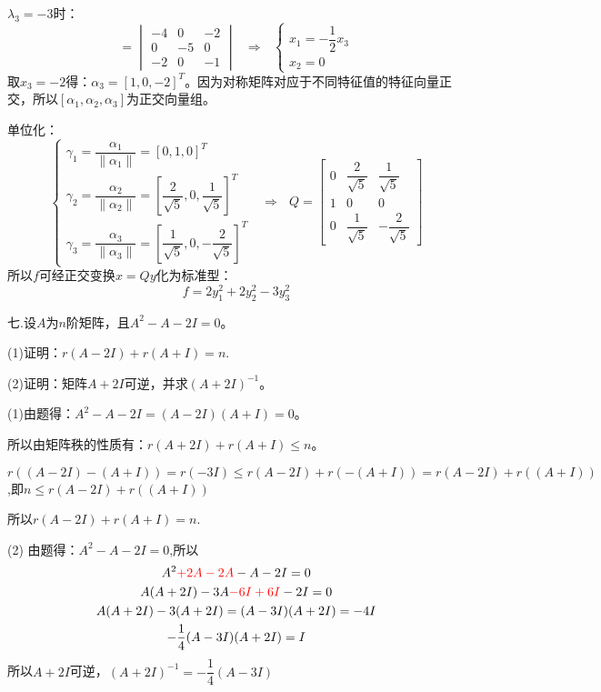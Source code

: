 \documentclass{article}
\begin{document}
\begin{jie}
$\lambda_3=-3$时：
\begin{equation*}
  [\lambda E-A]=
  \begin{vmatrix}
  -4& 0 & -2\\
  0 & -5 & 0\\
  -2 & 0 & -1
  \end{vmatrix}~~~\Rightarrow~~~
  \begin{cases}
   x_1=-\dfrac{1}{2}x_3\\
   x_2=0
  \end{cases}
\end{equation*}
取$x_3=-2$得：$\alpha_3=[1,0,-2]^T$。因为对称矩阵对应于不同特征值的特征向量正交，所以$[\alpha_1,\alpha_2,\alpha_3]$为正交向量组。

单位化：
\begin{equation*}
\begin{cases}
\gamma_1=\dfrac{\alpha_1}{\|\alpha_1\|}=[0,1,0]^T\\
\gamma_2=\dfrac{\alpha_2}{\|\alpha_2\|}=\left[\dfrac{2}{\sqrt{5}},0,\dfrac{1}{\sqrt{5}}\right]^T\\[2mm]
\gamma_3=\dfrac{\alpha_3}{\|\alpha_3\|}=\left[\dfrac{1}{\sqrt{5}},0,-\dfrac{2}{\sqrt{5}}\right]^T
\end{cases}~~~\Rightarrow~~~Q=
\begin{bmatrix}
  0 & \dfrac{2}{\sqrt{5}}& \dfrac{1}{\sqrt{5}} \\
  1 & 0& 0\\
  0&  \dfrac{1}{\sqrt{5}}& -\dfrac{2}{\sqrt{5}}
\end{bmatrix}
\end{equation*}
所以$f$可经正交变换$x=Qy$化为标准型：
\begin{equation*}
  f=2y_{1}^2+2y_{2}^2-3y_{3}^2
\end{equation*}
\end{jie}

七.设$A$为$n$阶矩阵，且$A^{2}-A-2I=0$。

(1)证明：$r(A-2I)+r(A+I)=n$.

(2)证明：矩阵$A+2I$可逆，并求$(A+2I)^{-1}$。

\begin{zhengming}
(1)由题得：$A^{2}-A-2I=(A-2I)(A+I)=0$。

所以由矩阵秩的性质有：$r(A+2I)+r(A+I)\leq n$。

$r((A-2I)-(A+I))=r(-3I)\leq r(A-2I)+r(-(A+I))=r(A-2I)+r((A+I))$,即$n\leq r(A-2I)+r((A+I))$

所以$r(A-2I)+r(A+I)=n$.

(2) 由题得：$A^{2}-A-2I=0$,所以
\begin{gather*}
  A^{2}\textcolor[rgb]{1.00,0.00,0.00}{+2A-2A}-A-2I=0 \\
  A(A+2I)-3A\textcolor[rgb]{1.00,0.00,0.00}{-6I+6I}-2I=0 \\
  A(A+2I)-3(A+2I)=(A-3I)(A+2I)=-4I\\
  -\frac{1}{4}(A-3I)(A+2I)=I
\end{gather*}
所以$A+2I$可逆，$(A+2I)^{-1}=-\dfrac{1}{4}(A-3I)$
\end{zhengming}
\end{document}
